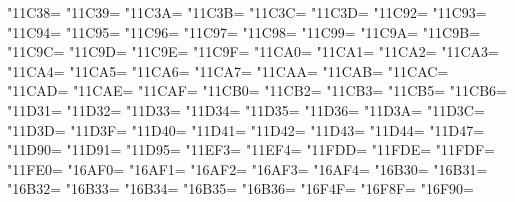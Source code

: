 \XeTeXcharclass"11C38=\KclassNum
\XeTeXcharclass"11C39=\KclassNum
\XeTeXcharclass"11C3A=\KclassNum
\XeTeXcharclass"11C3B=\KclassNum
\XeTeXcharclass"11C3C=\KclassNum
\XeTeXcharclass"11C3D=\KclassNum
\XeTeXcharclass"11C92=\KclassNum
\XeTeXcharclass"11C93=\KclassNum
\XeTeXcharclass"11C94=\KclassNum
\XeTeXcharclass"11C95=\KclassNum
\XeTeXcharclass"11C96=\KclassNum
\XeTeXcharclass"11C97=\KclassNum
\XeTeXcharclass"11C98=\KclassNum
\XeTeXcharclass"11C99=\KclassNum
\XeTeXcharclass"11C9A=\KclassNum
\XeTeXcharclass"11C9B=\KclassNum
\XeTeXcharclass"11C9C=\KclassNum
\XeTeXcharclass"11C9D=\KclassNum
\XeTeXcharclass"11C9E=\KclassNum
\XeTeXcharclass"11C9F=\KclassNum
\XeTeXcharclass"11CA0=\KclassNum
\XeTeXcharclass"11CA1=\KclassNum
\XeTeXcharclass"11CA2=\KclassNum
\XeTeXcharclass"11CA3=\KclassNum
\XeTeXcharclass"11CA4=\KclassNum
\XeTeXcharclass"11CA5=\KclassNum
\XeTeXcharclass"11CA6=\KclassNum
\XeTeXcharclass"11CA7=\KclassNum
\XeTeXcharclass"11CAA=\KclassNum
\XeTeXcharclass"11CAB=\KclassNum
\XeTeXcharclass"11CAC=\KclassNum
\XeTeXcharclass"11CAD=\KclassNum
\XeTeXcharclass"11CAE=\KclassNum
\XeTeXcharclass"11CAF=\KclassNum
\XeTeXcharclass"11CB0=\KclassNum
\XeTeXcharclass"11CB2=\KclassNum
\XeTeXcharclass"11CB3=\KclassNum
\XeTeXcharclass"11CB5=\KclassNum
\XeTeXcharclass"11CB6=\KclassNum
\XeTeXcharclass"11D31=\KclassNum
\XeTeXcharclass"11D32=\KclassNum
\XeTeXcharclass"11D33=\KclassNum
\XeTeXcharclass"11D34=\KclassNum
\XeTeXcharclass"11D35=\KclassNum
\XeTeXcharclass"11D36=\KclassNum
\XeTeXcharclass"11D3A=\KclassNum
\XeTeXcharclass"11D3C=\KclassNum
\XeTeXcharclass"11D3D=\KclassNum
\XeTeXcharclass"11D3F=\KclassNum
\XeTeXcharclass"11D40=\KclassNum
\XeTeXcharclass"11D41=\KclassNum
\XeTeXcharclass"11D42=\KclassNum
\XeTeXcharclass"11D43=\KclassNum
\XeTeXcharclass"11D44=\KclassNum
\XeTeXcharclass"11D47=\KclassNum
\XeTeXcharclass"11D90=\KclassNum
\XeTeXcharclass"11D91=\KclassNum
\XeTeXcharclass"11D95=\KclassNum
\XeTeXcharclass"11EF3=\KclassNum
\XeTeXcharclass"11EF4=\KclassNum
\XeTeXcharclass"11FDD=\KclassNum
\XeTeXcharclass"11FDE=\KclassNum
\XeTeXcharclass"11FDF=\KclassNum
\XeTeXcharclass"11FE0=\KclassNum
\XeTeXcharclass"16AF0=\KclassNum
\XeTeXcharclass"16AF1=\KclassNum
\XeTeXcharclass"16AF2=\KclassNum
\XeTeXcharclass"16AF3=\KclassNum
\XeTeXcharclass"16AF4=\KclassNum
\XeTeXcharclass"16B30=\KclassNum
\XeTeXcharclass"16B31=\KclassNum
\XeTeXcharclass"16B32=\KclassNum
\XeTeXcharclass"16B33=\KclassNum
\XeTeXcharclass"16B34=\KclassNum
\XeTeXcharclass"16B35=\KclassNum
\XeTeXcharclass"16B36=\KclassNum
\XeTeXcharclass"16F4F=\KclassNum
\XeTeXcharclass"16F8F=\KclassNum
\XeTeXcharclass"16F90=\KclassNum
